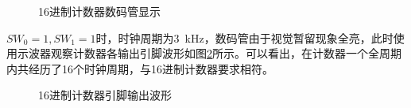 \documentclass[UTF8]{ctexart}
\numberwithin{figure}{subsection}
\numberwithin{table}{subsection}
\numberwithin{equation}{subsection}
\begin{document}
\begin{figure}[H]

    
    \caption{16进制计数器数码管显示}
    \label{16counter_slow}
\end{figure}

\(SW_0 =1 ,  SW_1 = 1\)时，时钟周期为\SI{3}{\kHz}，数码管由于视觉暂留现象全亮，此时使用示波器观察计数器各输出引脚波形如图\ref{16counter_fast}所示。可以看出，在计数器一个全周期内共经历了16个时钟周期，与16进制计数器要求相符。

\begin{figure}[H]
    \centering

    
    \caption{16进制计数器引脚输出波形}
    \label{16counter_fast}
\end{figure}
\end{document}

